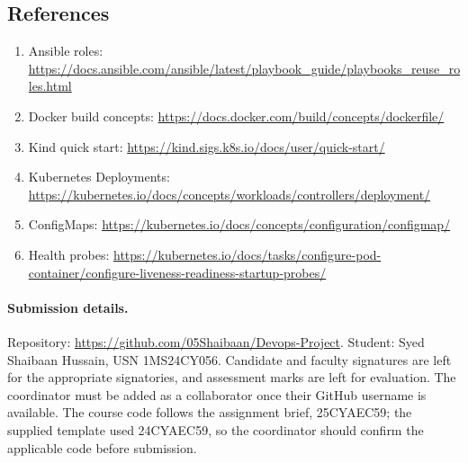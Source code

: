 \documentclass[12pt,a4paper]{article}
\begin{document}
\subsection*{References}
\begin{enumerate}
\item Ansible roles: \url{https://docs.ansible.com/ansible/latest/playbook_guide/playbooks_reuse_roles.html}
\item Docker build concepts: \url{https://docs.docker.com/build/concepts/dockerfile/}
\item Kind quick start: \url{https://kind.sigs.k8s.io/docs/user/quick-start/}
\item Kubernetes Deployments: \url{https://kubernetes.io/docs/concepts/workloads/controllers/deployment/}
\item ConfigMaps: \url{https://kubernetes.io/docs/concepts/configuration/configmap/}
\item Health probes: \url{https://kubernetes.io/docs/tasks/configure-pod-container/configure-liveness-readiness-startup-probes/}
\end{enumerate}
\paragraph{Submission details.} Repository: \url{https://github.com/05Shaibaan/Devops-Project}. Student: Syed Shaibaan Hussain, USN 1MS24CY056. Candidate and faculty signatures are left for the appropriate signatories, and assessment marks are left for evaluation. The coordinator must be added as a collaborator once their GitHub username is available. The course code follows the assignment brief, 25CYAEC59; the supplied template used 24CYAEC59, so the coordinator should confirm the applicable code before submission.
\end{document}
